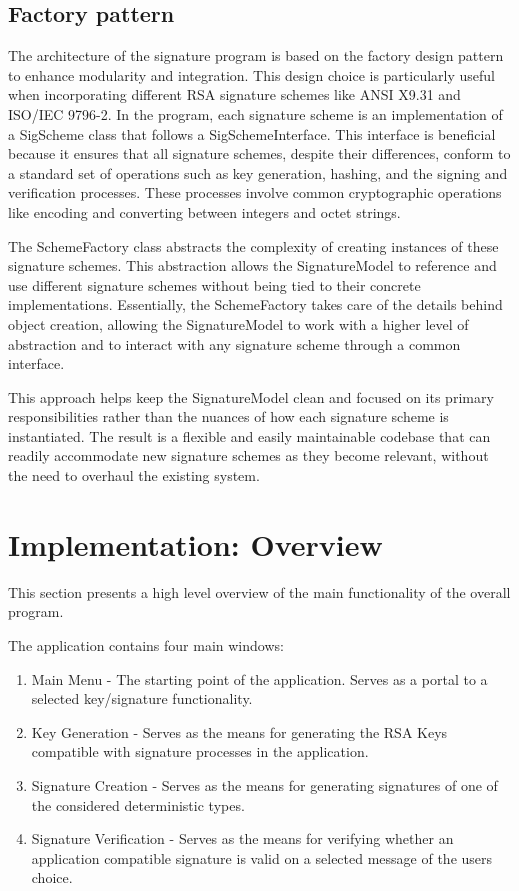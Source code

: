 \documentclass[]{final_report}
\theoremstyle{definition}
\begin{document}
\subsection{Factory pattern}
The architecture of the signature program is based on the factory design pattern to enhance modularity and integration. This design choice is particularly useful when incorporating different RSA signature schemes like ANSI X9.31 and ISO/IEC 9796-2. In the program, each signature scheme is an implementation of a SigScheme class that follows a SigSchemeInterface. This interface is beneficial because it ensures that all signature schemes, despite their differences, conform to a standard set of operations such as key generation, hashing, and the signing and verification processes. These processes involve common cryptographic operations like encoding and converting between integers and octet strings.

The SchemeFactory class abstracts the complexity of creating instances of these signature schemes. This abstraction allows the SignatureModel to reference and use different signature schemes without being tied to their concrete implementations. Essentially, the SchemeFactory takes care of the details behind object creation, allowing the SignatureModel to work with a higher level of abstraction and to interact with any signature scheme through a common interface.

This approach helps keep the SignatureModel clean and focused on its primary responsibilities rather than the nuances of how each signature scheme is instantiated. The result is a flexible and easily maintainable codebase that can readily accommodate new signature schemes as they become relevant, without the need to overhaul the existing system.


\section{Implementation: Overview}

This section presents a high level overview of the main functionality of the overall program.

The application contains four main windows:
\begin{enumerate}
\item Main Menu - The starting point of the application. Serves as a portal to a selected key/signature functionality. 
\item Key Generation - Serves as the means for generating the RSA Keys compatible with signature processes in the application. 
\item Signature Creation - Serves as the means for generating signatures of one of the considered deterministic types.
\item Signature Verification - Serves as the means for verifying whether an application compatible signature is valid on a selected message of the users choice.
\end{enumerate}
\end{document}
